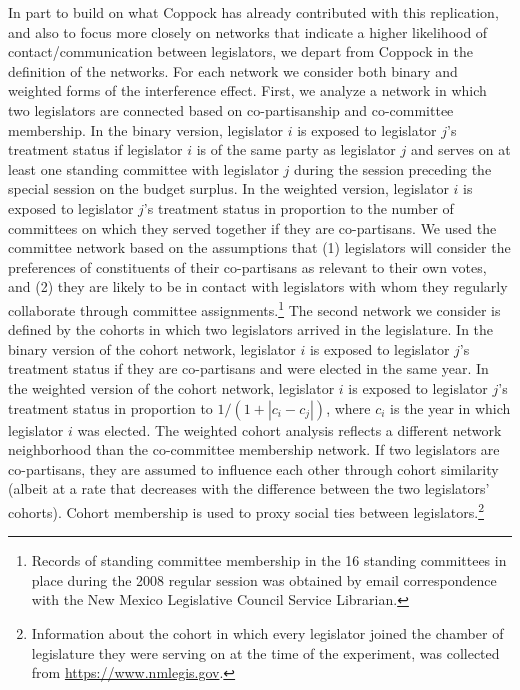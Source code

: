 \documentclass[12pt]{article}
\begin{document}
In part to build on what Coppock has already contributed with this replication, and also to focus more closely on networks that indicate a higher likelihood of contact/communication between legislators, we depart from Coppock in the definition of the networks. For each network we consider both binary and weighted forms of the interference effect. First, we analyze a network in which two legislators are connected based on co-partisanship and co-committee membership. In the binary version, legislator $i$ is exposed to legislator $j$'s treatment status if legislator $i$ is of the same party as legislator $j$ and serves on at least one standing committee with legislator $j$ during the session preceding the special session on the budget surplus. In the weighted version, legislator $i$ is exposed to legislator $j$'s treatment status in proportion to the number of committees on which they served together if they are co-partisans. We used the committee network based on the assumptions that (1) legislators will consider the preferences of constituents of their co-partisans as relevant to their own votes, and (2) they are likely to be in contact with legislators with whom they regularly collaborate through committee assignments.\footnote{Records of standing committee membership in the 16 standing committees in place during the 2008 regular session was obtained by email correspondence with the New Mexico Legislative Council Service Librarian.}  The second network we consider is defined by the cohorts in which two legislators arrived in the legislature. In the binary version of the cohort network, legislator $i$ is exposed to legislator $j$'s treatment status if they are co-partisans and were elected in the same year. In the weighted version of the cohort network, legislator $i$ is exposed to legislator $j$'s treatment status in proportion to $1/(1+|c_i-c_j|)$, where $c_i$ is the year in which legislator $i$ was elected. The weighted cohort analysis reflects a different network neighborhood than the co-committee membership network. If two legislators are co-partisans, they are assumed to influence each other through cohort similarity (albeit at a rate that decreases with the difference between the two legislators' cohorts). Cohort membership is used to proxy social ties between legislators.\footnote{Information about the cohort in which every legislator joined the chamber of legislature they were serving on at the time of the experiment, was collected from \url{https://www.nmlegis.gov}.}
\end{document}

